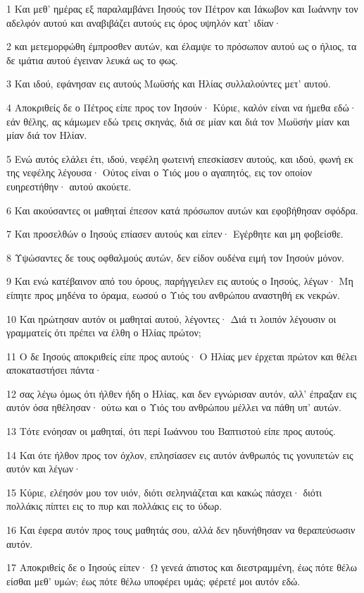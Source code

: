 \par 1 Και μεθ' ημέρας εξ παραλαμβάνει Ιησούς τον Πέτρον και Ιάκωβον και Ιωάννην τον αδελφόν αυτού και αναβιβάζει αυτούς εις όρος υψηλόν κατ' ιδίαν·
\par 2 και μετεμορφώθη έμπροσθεν αυτών, και έλαμψε το πρόσωπον αυτού ως ο ήλιος, τα δε ιμάτια αυτού έγειναν λευκά ως το φως.
\par 3 Και ιδού, εφάνησαν εις αυτούς Μωϋσής και Ηλίας συλλαλούντες μετ' αυτού.
\par 4 Αποκριθείς δε ο Πέτρος είπε προς τον Ιησούν· Κύριε, καλόν είναι να ήμεθα εδώ· εάν θέλης, ας κάμωμεν εδώ τρεις σκηνάς, διά σε μίαν και διά τον Μωϋσήν μίαν και μίαν διά τον Ηλίαν.
\par 5 Ενώ αυτός ελάλει έτι, ιδού, νεφέλη φωτεινή επεσκίασεν αυτούς, και ιδού, φωνή εκ της νεφέλης λέγουσα· Ούτος είναι ο Υιός μου ο αγαπητός, εις τον οποίον ευηρεστήθην· αυτού ακούετε.
\par 6 Και ακούσαντες οι μαθηταί έπεσον κατά πρόσωπον αυτών και εφοβήθησαν σφόδρα.
\par 7 Και προσελθών ο Ιησούς επίασεν αυτούς και είπεν· Εγέρθητε και μη φοβείσθε.
\par 8 Υψώσαντες δε τους οφθαλμούς αυτών, δεν είδον ουδένα ειμή τον Ιησούν μόνον.
\par 9 Και ενώ κατέβαινον από του όρους, παρήγγειλεν εις αυτούς ο Ιησούς, λέγων· Μη είπητε προς μηδένα το όραμα, εωσού ο Υιός του ανθρώπου αναστηθή εκ νεκρών.
\par 10 Και ηρώτησαν αυτόν οι μαθηταί αυτού, λέγοντες· Διά τι λοιπόν λέγουσιν οι γραμματείς ότι πρέπει να έλθη ο Ηλίας πρώτον;
\par 11 Ο δε Ιησούς αποκριθείς είπε προς αυτούς· Ο Ηλίας μεν έρχεται πρώτον και θέλει αποκαταστήσει πάντα·
\par 12 σας λέγω όμως ότι ήλθεν ήδη ο Ηλίας, και δεν εγνώρισαν αυτόν, αλλ' έπραξαν εις αυτόν όσα ηθέλησαν· ούτω και ο Υιός του ανθρώπου μέλλει να πάθη υπ' αυτών.
\par 13 Τότε ενόησαν οι μαθηταί, ότι περί Ιωάννου του Βαπτιστού είπε προς αυτούς.
\par 14 Και ότε ήλθον προς τον όχλον, επλησίασεν εις αυτόν άνθρωπός τις γονυπετών εις αυτόν και λέγων·
\par 15 Κύριε, ελέησόν μου τον υιόν, διότι σεληνιάζεται και κακώς πάσχει· διότι πολλάκις πίπτει εις το πυρ και πολλάκις εις το ύδωρ.
\par 16 Και έφερα αυτόν προς τους μαθητάς σου, αλλά δεν ηδυνήθησαν να θεραπεύσωσιν αυτόν.
\par 17 Αποκριθείς δε ο Ιησούς είπεν· Ω γενεά άπιστος και διεστραμμένη, έως πότε θέλω είσθαι μεθ' υμών; έως πότε θέλω υποφέρει υμάς; φέρετέ μοι αυτόν εδώ.

